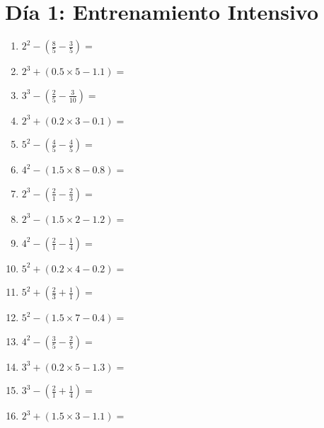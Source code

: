 \documentclass[12pt]{article}
\begin{document}
\section*{Día 1: Entrenamiento Intensivo}
\begin{enumerate}
\item \large $ 2^{2} - (\frac{8}{5} - \frac{3}{5}) = $ \vspace{1.6cm}
\item \large $ 2^{3} + (0.5 \times 5 - 1.1) = $ \vspace{1.6cm}
\item \large $ 3^{3} - (\frac{2}{5} - \frac{3}{10}) = $ \vspace{1.6cm}
\item \large $ 2^{3} + (0.2 \times 3 - 0.1) = $ \vspace{1.6cm}
\item \large $ 5^{2} - (\frac{4}{5} - \frac{4}{5}) = $ \vspace{1.6cm}
\item \large $ 4^{2} - (1.5 \times 8 - 0.8) = $ \vspace{1.6cm}
\item \large $ 2^{3} - (\frac{2}{1} - \frac{2}{3}) = $ \vspace{1.6cm}
\item \large $ 2^{3} - (1.5 \times 2 - 1.2) = $ \vspace{1.6cm}
\item \large $ 4^{2} - (\frac{2}{1} - \frac{1}{4}) = $ \vspace{1.6cm}
\item \large $ 5^{2} + (0.2 \times 4 - 0.2) = $ \vspace{1.6cm}
\newpage
\item \large $ 5^{2} + (\frac{2}{3} + \frac{1}{1}) = $ \vspace{1.6cm}
\item \large $ 5^{2} - (1.5 \times 7 - 0.4) = $ \vspace{1.6cm}
\item \large $ 4^{2} - (\frac{3}{5} - \frac{2}{5}) = $ \vspace{1.6cm}
\item \large $ 3^{3} + (0.2 \times 5 - 1.3) = $ \vspace{1.6cm}
\item \large $ 3^{3} - (\frac{2}{1} + \frac{1}{4}) = $ \vspace{1.6cm}
\item \large $ 2^{3} + (1.5 \times 3 - 1.1) = $ \vspace{1.6cm}

\end{enumerate}
\end{document}
